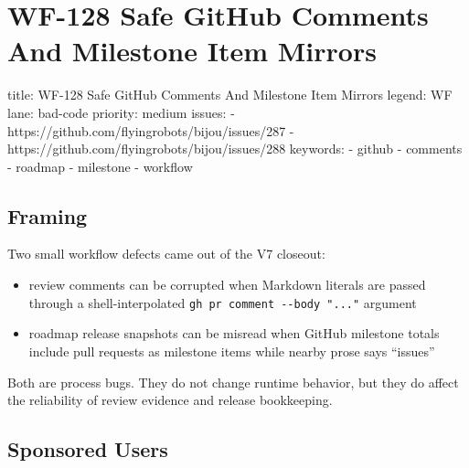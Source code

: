 \chapter{WF-128 Safe GitHub Comments And Milestone Item Mirrors}\label{record-210}

\smallskip

\begin{RecordMeta}
title: WF-128 Safe GitHub Comments And Milestone Item Mirrors
legend: WF
lane: bad-code
priority: medium
issues:
  - https://github.com/flyingrobots/bijou/issues/287
  - https://github.com/flyingrobots/bijou/issues/288
keywords:
  - github
  - comments
  - roadmap
  - milestone
  - workflow

\end{RecordMeta}

\section{Framing}\label{record-210-framing}

Two small workflow defects came out of the V7 closeout:

\begin{itemize}
\tightlist
\item
  review comments can be corrupted when Markdown literals are passed through a shell-interpolated \texttt{g\allowbreak{}h\allowbreak{} \allowbreak{}p\allowbreak{}r\allowbreak{} \allowbreak{}c\allowbreak{}o\allowbreak{}m\allowbreak{}m\allowbreak{}e\allowbreak{}n\allowbreak{}t\allowbreak{} \allowbreak{}-\allowbreak{}-\allowbreak{}b\allowbreak{}o\allowbreak{}d\allowbreak{}y\allowbreak{} \allowbreak{}"\allowbreak{}.\allowbreak{}.\allowbreak{}.\allowbreak{}"} argument
\item
  roadmap release snapshots can be misread when GitHub milestone totals include pull requests as milestone items while nearby prose says ``issues''
\end{itemize}

Both are process bugs. They do not change runtime behavior, but they do affect the reliability of review evidence and release bookkeeping.

\section{Sponsored Users}\label{record-210-sponsored-users}

